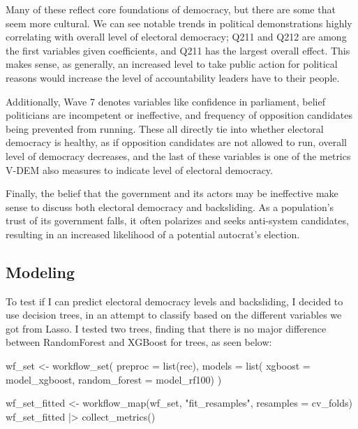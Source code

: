 \documentclass[
  letterpaper,
  DIV=11,
  numbers=noendperiod]{scrartcl}
\newenvironment{Shaded}{\begin{snugshade}}{\end{snugshade}}
\newcommand{\AttributeTok}[1]{\textcolor[rgb]{0.40,0.45,0.13}{#1}}
\newcommand{\FunctionTok}[1]{\textcolor[rgb]{0.28,0.35,0.67}{#1}}
\newcommand{\NormalTok}[1]{\textcolor[rgb]{0.00,0.23,0.31}{#1}}
\newcommand{\OtherTok}[1]{\textcolor[rgb]{0.00,0.23,0.31}{#1}}
\newcommand{\SpecialCharTok}[1]{\textcolor[rgb]{0.37,0.37,0.37}{#1}}
\newcommand{\StringTok}[1]{\textcolor[rgb]{0.13,0.47,0.30}{#1}}
\begin{document}
Many of these reflect core foundations of democracy, but there are some
that seem more cultural. We can see notable trends in political
demonstrations highly correlating with overall level of electoral
democracy; Q211 and Q212 are among the first variables given
coefficients, and Q211 has the largest overall effect. This makes sense,
as generally, an increased level to take public action for political
reasons would increase the level of accountability leaders have to their
people.

Additionally, Wave 7 denotes variables like confidence in parliament,
belief politicians are incompetent or ineffective, and frequency of
opposition candidates being prevented from running. These all directly
tie into whether electoral democracy is healthy, as if opposition
candidates are not allowed to run, overall level of democracy decreases,
and the last of these variables is one of the metrics V-DEM also
measures to indicate level of electoral democracy.

Finally, the belief that the government and its actors may be
ineffective make sense to discuss both electoral democracy and
backsliding. As a population's trust of its government falls, it often
polarizes and seeks anti-system candidates, resulting in an increased
likelihood of a potential autocrat's election.

\subsection{Modeling}\label{modeling}

To test if I can predict electoral democracy levels and backsliding, I
decided to use decision trees, in an attempt to classify based on the
different variables we got from Lasso. I tested two trees, finding that
there is no major difference between RandomForest and XGBoost for trees,
as seen below:

\begin{Shaded}
\begin{Highlighting}[]
\NormalTok{wf\_set }\OtherTok{\textless{}{-}} \FunctionTok{workflow\_set}\NormalTok{(}
  \AttributeTok{preproc =} \FunctionTok{list}\NormalTok{(rec),}
  \AttributeTok{models =} \FunctionTok{list}\NormalTok{(}
    \AttributeTok{xgboost =}\NormalTok{ model\_xgboost,}
    \AttributeTok{random\_forest =}\NormalTok{ model\_rf100)}
\NormalTok{)}
  
\NormalTok{wf\_set\_fitted }\OtherTok{\textless{}{-}} \FunctionTok{workflow\_map}\NormalTok{(wf\_set, }\StringTok{"fit\_resamples"}\NormalTok{, }\AttributeTok{resamples =}\NormalTok{ cv\_folds)}
\NormalTok{wf\_set\_fitted }\SpecialCharTok{|\textgreater{}} \FunctionTok{collect\_metrics}\NormalTok{()}
\end{Highlighting}
\end{Shaded}
\end{document}
